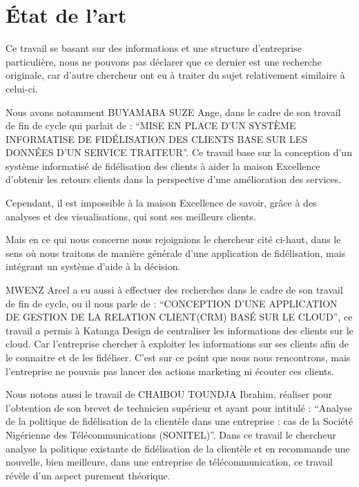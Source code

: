     \section[Etat de l'art]{État de l’art} %
    Ce travail se basant sur des informations et une structure d’entreprise particulière, nous ne
    pouvons pas déclarer que ce dernier est une recherche originale, car d’autre chercheur ont eu
    à traiter du sujet relativement similaire à celui-ci.
    \par
    Nous avons notamment BUYAMABA SUZE Ange, dans le cadre de son travail de fin de cycle
    qui parlait de : \enquote{MISE EN PLACE D’UN SYSTÈME INFORMATISE DE FIDÉLISATION DES 
    CLIENTS BASE SUR LES DONNÉES D’UN SERVICE TRAITEUR}. Ce travail base sur la conception
    d’un système informatisé de fidélisation des clients à aider la maison Excellence
    d’obtenir les retours clients dans la perspective d’une amélioration des services.
    \cite{Buyamba2017}
    \par
    Cependant, il est impossible à la maison Excellence de savoir, grâce à des analyses
    et des visualisations, qui sont ses meilleurs clients. 
    \par
    Mais en ce qui nous concerne nous rejoignions le chercheur cité ci-haut, dans le sens
    où nous traitons de manière générale d’une application de fidélisation, mais intégrant
    un système d’aide à la décision.
    \par
    MWENZ Arcel a eu aussi à effectuer des recherches
    dans le cadre de son  travail de fin de cycle, ou il nous parle de :
    \enquote{CONCEPTION D’UNE APPLICATION DE GESTION DE LA RELATION CLIENT(CRM) BASÉ SUR LE CLOUD},
    ce travail a permis à Katanga Design de centraliser les informations
    des clients sur le cloud. Car l’entreprise chercher à exploiter les
    informations sur ses clients afin de le connaitre et de les fidéliser. \cite*{Mwenz2017}
    C’est sur ce point que nous nous rencontrons, mais l’entreprise ne
    pouvais pas lancer des actions marketing ni écouter ces clients.
    \par
    Nous notons aussi le travail de CHAIBOU TOUNDJA Ibrahim, réaliser
    pour l’obtention de son brevet de technicien supérieur et ayant pour
    intitulé : \enquote{Analyse de la politique de fidélisation de la
    clientèle dans une entreprise : cas de la Société Nigérienne des
    Télécommunications (SONITEL)}. Dans ce travail le chercheur analyse
    la politique existante de fidélisation de la clientèle et en
    recommande une nouvelle, bien meilleure, dans une entreprise de
    télécommunication, ce travail révèle d’un aspect purement théorique. \cite*{chaibou2012sonitel} 


